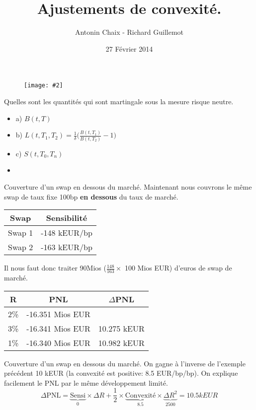 \documentclass{beamer}
\title[Produits dérivés de taux]{Ajustements de convexité. }
\author{Antonin Chaix - Richard Guillemot}
\institute{Master IFMA}
\date{27 Février 2014}
\newcommand{\FIG}[2]{\texttt{[image: \#2]}}
\begin{document}
\begin{frame}
\titlepage
\begin{figure}[h]
\centering \FIG{5cm}{figures/UPMC_IFMA.jpg}
\end{figure}
\end{frame}

Quelles sont les quantités qui sont martingale sous la mesure risque neutre.
\begin{itemize}
\item a) $B(t,T)$
\item b) $L(t,T_1,T_2)=\frac{1}{\delta}\big(\frac{B(t,T_1)}{B(t,T_2)}-1 \big)$
\item c) $S(t,T_0,T_n)$
\item
\end{itemize}

\begin{frame}{Couverture d'un swap en dessous du marché.}
Maintenant nous couvrons le même swap de taux fixe 100bp \textbf{en dessous} du taux de marché.\\
\begin{center}
\begin{tabular}{|c|c|}
\hline
Swap&Sensibilité \\ 
\hline
Swap 1 &-148 kEUR/bp \\ 
Swap 2 &-163 kEUR/bp \\ 
\hline
\end{tabular}
\end{center}
Il nous faut donc traiter 90Mios ($\frac{148}{163} \times$ 100 Mios EUR)  d'euros de swap de marché. 
\begin{center}
\begin{tabular}{|c|c|c|}
\hline
R&PNL&$\Delta$PNL \\ 
\hline
2\% &-16.351 Mios EUR& \\ 
3\% &-16.341 Mios EUR&10.275 kEUR\\ 
1\% &-16.340 Mios EUR&10.982 kEUR\\ 
\hline
\end{tabular}
\end{center}
\end{frame}
\begin{frame}{Couverture d'un swap en dessous du marché.}
On gagne à l'inverse de l'exemple précédent 10 kEUR (la convexité est positive: 8.5 EUR/bp/bp).
On explique facilement le PNL par le même développement limité.
\[
\Delta \text{PNL}=\underbrace{\text{Sensi}}_{0} \times \Delta R + \frac{1}{2} \times \underbrace{\text{Convexité}}_{8.5} \times \underbrace{\Delta R^2}_{2500}=10.5 kEUR
\]
\end{frame}
\end{document}
